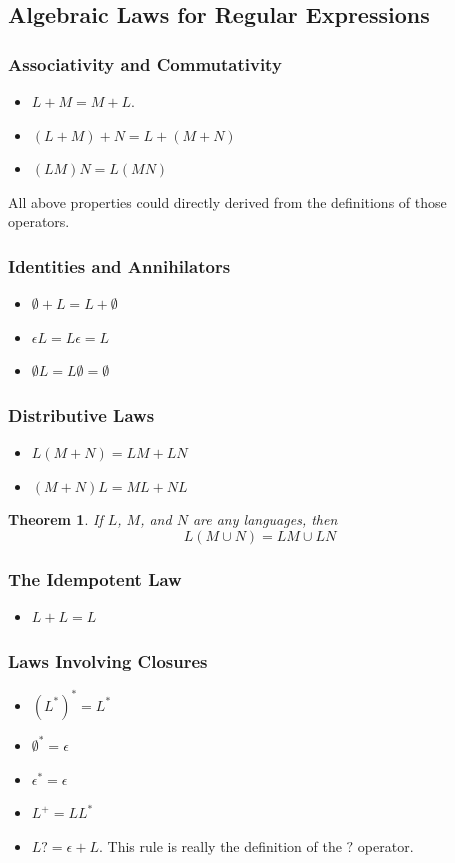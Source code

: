 \documentclass[12pt,reqno]{amsart}
\newtheorem{thm}{Theorem}[section]
\begin{document}
\subsection{Algebraic Laws for Regular Expressions}
\subsubsection{Associativity and Commutativity}
\begin{itemize}
	\item $L + M = M + L$.
	\item $(L + M) + N = L + (M + N)$
	\item $(LM)N = L(MN)$
\end{itemize}
All above properties could directly derived from the definitions of those operators.

\subsubsection{Identities and Annihilators}
\begin{itemize}
	\item $\emptyset + L = L + \emptyset$
	\item $\epsilon L = L \epsilon = L$
	\item $\emptyset L = L \emptyset = \emptyset$
\end{itemize}

\subsubsection{Distributive Laws}
\begin{itemize}
	\item $L(M + N) = LM + LN$
	\item $(M + N)L = ML + NL$
\end{itemize}
\begin{thm}
	If $L$, $M$, and $N$ are any languages, then
	$$
		L(M\cup N) = LM \cup LN
	$$
\end{thm}

\subsubsection{The Idempotent Law}
\begin{itemize}
	\item $L + L = L$
\end{itemize}

\subsubsection{Laws Involving Closures}
\begin{itemize}
	\item $(L^*)^* = L^*$
	\item $\emptyset^* = \epsilon$
	\item $\epsilon^* = \epsilon$
	\item $L^+ = LL^*$
	\item $L? = \epsilon + L$. This rule is really the definition of the $?$ operator.
\end{itemize}
\end{document}
